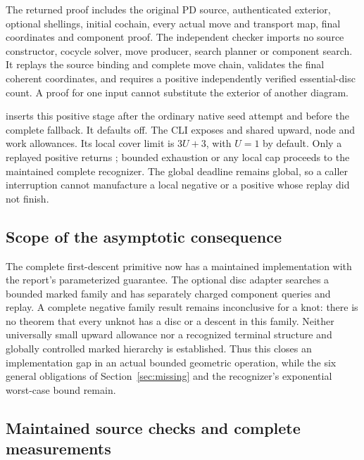 The returned  proof includes the original
PD source, authenticated exterior, optional shellings, initial cochain,
every actual move and transport map, final coordinates and component proof.
The independent checker imports no source constructor, cocycle solver,
move producer, search planner or component search. It replays the source
binding and complete move chain, validates the final coherent coordinates,
and requires a positive independently verified essential-disc count.
A proof for one input cannot substitute the exterior of another diagram.

 inserts this positive stage
after the ordinary native seed attempt and before the complete fallback.
It defaults off. The CLI exposes  and shared upward,
node and work allowances. Its local cover limit is $3U+3$, with $U=1$ by
default. Only a replayed positive returns ; bounded exhaustion
or any local cap proceeds to the maintained complete recognizer. The global
deadline remains global, so a caller interruption cannot manufacture a
local negative or a positive whose replay did not finish.

\subsection{Scope of the asymptotic consequence}

The complete first-descent primitive now has a maintained implementation
with the report's parameterized guarantee. The optional disc adapter searches
a bounded marked family and has separately charged component queries and
replay. A complete negative family result remains inconclusive for a knot:
there is no theorem that every unknot has a disc or a descent in this family.
Neither universally small upward allowance nor a recognized terminal
structure and globally controlled marked hierarchy is established.
Thus this closes an implementation gap in an actual bounded geometric
operation, while the six general obligations of Section~\ref{sec:missing}
and the recognizer's exponential worst-case bound remain.

\subsection{Maintained source checks and complete measurements}


